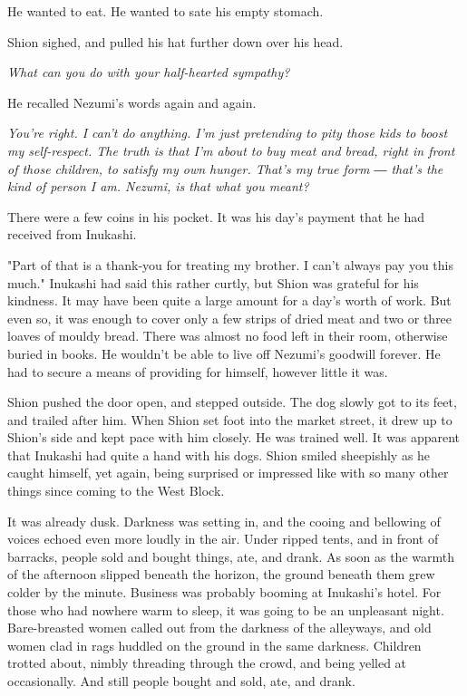 He wanted to eat. He wanted to sate his empty stomach.

Shion sighed, and pulled his hat further down over his head.

\emph{What can you do with your half-hearted sympathy?}

He recalled Nezumi's words again and again.

\emph{You're right. I can't do anything. I'm just pretending to pity those
kids to boost my self-respect. The truth is that I'm about to buy meat
and bread, right in front of those children, to satisfy my own hunger.
That's my true form ― that's the kind of person I am. Nezumi, is that
what you meant?}

There were a few coins in his pocket. It was his day's payment that he
had received from Inukashi.

"Part of that is a thank-you for treating my brother. I can't always pay
you this much." Inukashi had said this rather curtly, but Shion was
grateful for his kindness. It may have been quite a large amount for a
day's worth of work. But even so, it was enough to cover only a few
strips of dried meat and two or three loaves of mouldy bread. There was
almost no food left in their room, otherwise buried in books. He
wouldn't be able to live off Nezumi's goodwill forever. He had to secure
a means of providing for himself, however little it was.

Shion pushed the door open, and stepped outside. The dog slowly got to
its feet, and trailed after him. When Shion set foot into the market
street, it drew up to Shion's side and kept pace with him closely. He
was trained well. It was apparent that Inukashi had quite a hand with
his dogs. Shion smiled sheepishly as he caught himself, yet again, being
surprised or impressed like with so many other things since coming to
the West Block.

It was already dusk. Darkness was setting in, and the cooing and
bellowing of voices echoed even more loudly in the air. Under ripped
tents, and in front of barracks, people sold and bought things, ate, and
drank. As soon as the warmth of the afternoon slipped beneath the
horizon, the ground beneath them grew colder by the minute. Business was
probably booming at Inukashi's hotel. For those who had nowhere warm to
sleep, it was going to be an unpleasant night. Bare-breasted women
called out from the darkness of the alleyways, and old women clad in
rags huddled on the ground in the same darkness. Children trotted about,
nimbly threading through the crowd, and being yelled at occasionally.
And still people bought and sold, ate, and drank.

